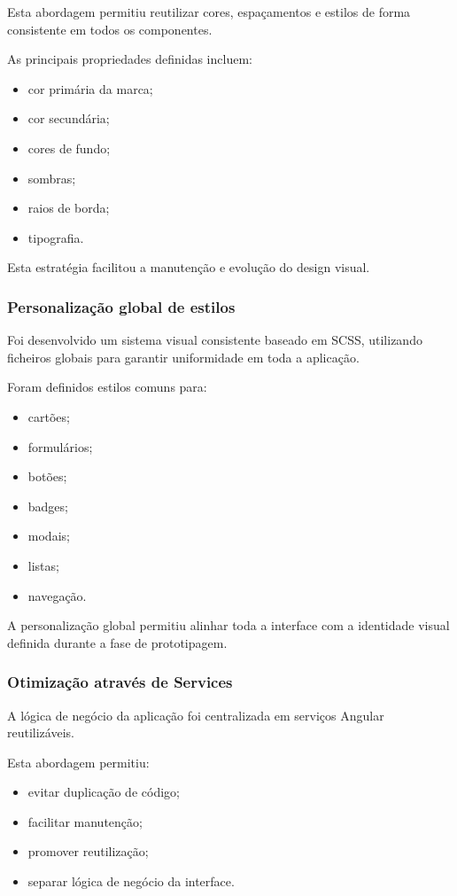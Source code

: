 \documentclass[12pt,a4paper]{article}
\begin{document}
Esta abordagem permitiu reutilizar cores, espaçamentos e estilos de forma consistente em todos os componentes.

As principais propriedades definidas incluem:

\begin{itemize}
\setlength{\itemsep}{0.15em}
\item cor primária da marca;
\item cor secundária;
\item cores de fundo;
\item sombras;
\item raios de borda;
\item tipografia.
\end{itemize}

Esta estratégia facilitou a manutenção e evolução do design visual.

\subsubsection{Personalização global de estilos}

Foi desenvolvido um sistema visual consistente baseado em SCSS, utilizando ficheiros globais para garantir uniformidade em toda a aplicação.

Foram definidos estilos comuns para:

\begin{itemize}
\setlength{\itemsep}{0.15em}
\item cartões;
\item formulários;
\item botões;
\item badges;
\item modais;
\item listas;
\item navegação.
\end{itemize}

A personalização global permitiu alinhar toda a interface com a identidade visual definida durante a fase de prototipagem.

\subsubsection{Otimização através de Services}

A lógica de negócio da aplicação foi centralizada em serviços Angular reutilizáveis.

Esta abordagem permitiu:

\begin{itemize}
\setlength{\itemsep}{0.15em}
\item evitar duplicação de código;
\item facilitar manutenção;
\item promover reutilização;
\item separar lógica de negócio da interface.
\end{itemize}
\end{document}
